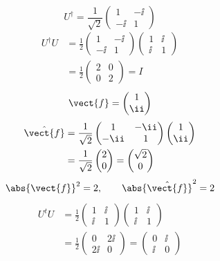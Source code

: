 \[
  U^{\dagger}=\frac{1}{\sqrt{2}}\begin{pmatrix}1&-\ii\\-\ii&1\end{pmatrix}
\]
\begin{align*}
  U^{\dagger}U&=\frac{1}{2}\begin{pmatrix}1&-\ii\\-\ii&1\end{pmatrix}\begin{pmatrix}1&\ii\\\ii&1\end{pmatrix}\\
  &=\frac{1}{2}\begin{pmatrix}2&0\\0&2\end{pmatrix}=I
\end{align*}
\[
  \vect{f}=\begin{pmatrix}1\\\ii\end{pmatrix}
\]
\begin{align*}
  \hat{\vect{f}}&=\frac{1}{\sqrt{2}}\begin{pmatrix}1&-\ii\\-\ii&1\end{pmatrix}\begin{pmatrix}1\\\ii\end{pmatrix}\\
  &=\frac{1}{\sqrt{2}}\begin{pmatrix}2\\0\end{pmatrix}=\begin{pmatrix}\sqrt{2}\\0\end{pmatrix}
\end{align*}
\[
  \abs{\vect{f}}^{2}=2,\qquad \abs{\hat{\vect{f}}}^{2}=2
\]
\begin{align*}
  U^{t}U&=\frac{1}{2}\begin{pmatrix}1&\ii\\\ii&1\end{pmatrix}\begin{pmatrix}1&\ii\\\ii&1\end{pmatrix}\\
  &=\frac{1}{2}\begin{pmatrix}0&2\ii\\2\ii&0\end{pmatrix}=\begin{pmatrix}0&\ii\\\ii&0\end{pmatrix}
\end{align*}
